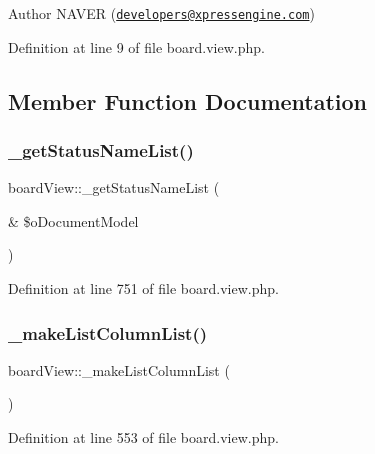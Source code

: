 \begin{DoxyAuthor}{Author}
N\+A\+V\+ER (\href{mailto:developers@xpressengine.com}{\tt developers@xpressengine.\+com}) 
\end{DoxyAuthor}


Definition at line 9 of file board.\+view.\+php.



\subsection{Member Function Documentation}
\mbox{\label{classboardView_a271618817f43707fea90ba411cad06c0}} 
\subsubsection{\texorpdfstring{\+\_\+get\+Status\+Name\+List()}{\_getStatusNameList()}}
{\footnotesize\ttfamily board\+View\+::\+\_\+get\+Status\+Name\+List (\begin{DoxyParamCaption}\item[{\&}]{\$o\+Document\+Model }\end{DoxyParamCaption})}



Definition at line 751 of file board.\+view.\+php.

\mbox{\label{classboardView_a9ceb0843ce6b0a30fb82deac87a40a22}} 
\subsubsection{\texorpdfstring{\+\_\+make\+List\+Column\+List()}{\_makeListColumnList()}}
{\footnotesize\ttfamily board\+View\+::\+\_\+make\+List\+Column\+List (\begin{DoxyParamCaption}{ }\end{DoxyParamCaption})}



Definition at line 553 of file board.\+view.\+php.

\mbox{\label{classboardView_a421e95c8dd73767264da56ca4d1e360d}} 

